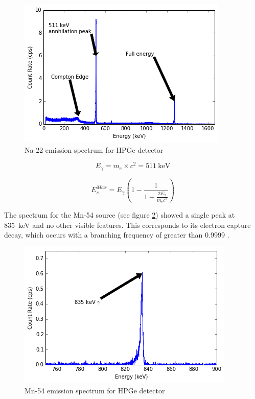\documentclass[12pt]{article}
\begin{document}
\begin{center}
\begin{figure}
	\includegraphics{hpge_na22}
	\caption{Na-22 emission spectrum for HPGe detector}
	\label{fig:na22hpge}
\end{figure}
\end{center}

\begin{equation}
	\label{eqn:annhilationenergy}
	E_\gamma = m_e \times c^2 = \SI{511}{\kilo\electronvolt}
\end{equation}

\begin{equation}
	\label{eqn:compton}
	E_s^{Max} = E_\gamma \left(1 - \frac{1}{1 + \frac{2E_\gamma}{m_e c^2}} \right)
\end{equation}

The spectrum for the Mn-54 source (see figure \ref{fig:mn54hpge}) showed a single peak at \SI{835}{\kilo\electronvolt} and no other visible features. This corresponds to its electron capture decay, which occurs with a branching frequency of greater than 0.9999 \cite{nucdata}.

\begin{center}
\begin{figure}
	\includegraphics{hpge_mn54}
	\caption{Mn-54 emission spectrum for HPGe detector}
	\label{fig:mn54hpge}
\end{figure}
\end{center}
\end{document}
